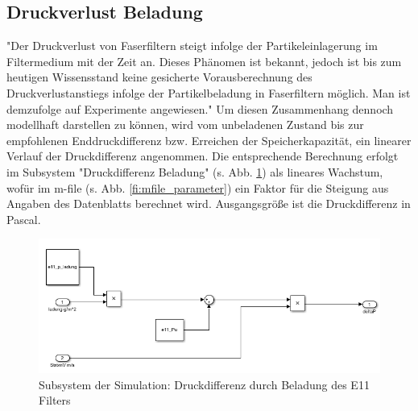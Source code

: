     \subsection{Druckverlust Beladung}
    "Der Druckverlust von Faserfiltern steigt infolge der Partikeleinlagerung im Filtermedium
mit der Zeit an. Dieses Phänomen ist bekannt, jedoch ist bis zum heutigen Wissensstand
keine gesicherte Vorausberechnung des Druckverlustanstiegs infolge der Partikelbeladung
in Faserfiltern möglich. Man ist demzufolge auf Experimente angewiesen."\cite{reinraum}
Um diesen Zusammenhang dennoch modellhaft darstellen zu können, wird vom unbeladenen Zustand bis zur empfohlenen Enddruckdifferenz bzw. Erreichen der Speicherkapazität, ein linearer Verlauf der Druckdifferenz angenommen. Die entsprechende Berechnung erfolgt im Subsystem "Druckdifferenz Beladung" (s. Abb. \ref{fi:sim_beladung}) als lineares Wachstum, wofür im m-file (s. Abb. \ref{fi:mfile_parameter}) ein Faktor für die Steigung aus Angaben des Datenblatts berechnet wird. Ausgangsgröße ist die Druckdifferenz in Pascal.
\begin{figure}[H]
    \begin{center}
        \includegraphics[width=\linewidth]{images/sim_beladung.png}
        \caption[Subsystem Druckdifferenz Beladung]{Subsystem der Simulation: Druckdifferenz durch Beladung des E11 Filters}
        \label{fi:sim_beladung}
    \end{center}
\end{figure}
